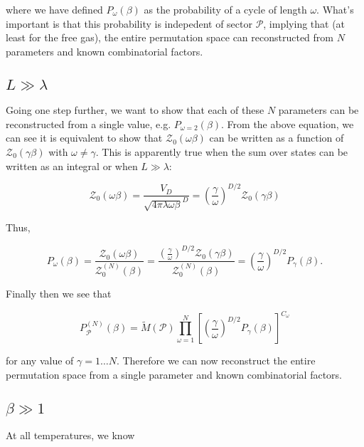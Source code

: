 \documentclass[aps,preprint,showpacs,superscriptaddress,groupedaddress]{revtex4}  %
\begin{document}
where we have defined $P_{\omega}(\beta)$ as the probability of a cycle of length $\omega$. What's important is that this probability is indepedent of sector $\mathcal{P}$, implying that (at least for the free gas), the entire permutation space can reconstructed from $N$ parameters and known combinatorial factors.

\subsection{$L \gg \lambda$}

Going one step further, we want to show that each of these $N$ parameters can be reconstructed from a single value, e.g. $P_{\omega=2}(\beta)$. From the above equation, we can see it is equivalent to show that $\mathcal{Z}_{0}(\omega\beta)$ can be written as a function of $\mathcal{Z}_{0}(\gamma\beta)$ with $\omega \neq \gamma$. This is apparently true when the sum over states can be written as an integral or when $L \gg \lambda$:

\begin{equation}
  \mathcal{Z}_{0}(\omega\beta) = \frac{V_{D}}{\sqrt{4\pi\lambda\omega\beta}^{D}} = (\frac{\gamma}{\omega})^{D/2} \mathcal{Z}_{0}(\gamma\beta)
\end{equation}

Thus,

\begin{equation}
  P_{\omega}(\beta) = \frac{\mathcal{Z}_{0}(\omega\beta)}{\mathcal{Z}_{0}^{(N)}(\beta)} = \frac{(\frac{\gamma}{\omega})^{D/2} \mathcal{Z}_{0}(\gamma\beta)}{\mathcal{Z}_{0}^{(N)}(\beta)} = (\frac{\gamma}{\omega})^{D/2} P_{\gamma}(\beta).
\end{equation}

Finally then we see that

\begin{equation}
  P_{\mathcal{P}}^{(N)}(\beta) = \tilde{M}(\mathcal{P}) \prod_{\omega=1}^{N} [(\frac{\gamma}{\omega})^{D/2} P_{\gamma}(\beta)]^{C_{\omega}}
\end{equation}

for any value of $\gamma = 1 \dots N$. Therefore we can now reconstruct the entire permutation space from a single parameter and known combinatorial factors.

\subsection{$\beta \gg 1$}

At all temperatures, we know
\end{document}
